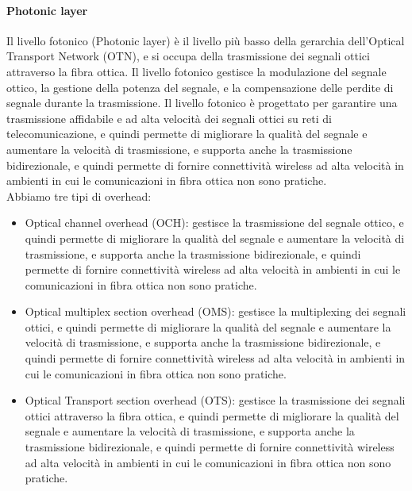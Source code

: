 \paragraph{Photonic layer}

Il livello fotonico (Photonic layer) è il livello più basso della gerarchia dell'Optical Transport Network (OTN), e si occupa della trasmissione dei segnali ottici attraverso la fibra ottica. Il livello fotonico gestisce la modulazione del segnale ottico, la gestione della potenza del segnale, e la compensazione delle perdite di segnale durante la trasmissione. Il livello fotonico è progettato per garantire una trasmissione affidabile e ad alta velocità dei segnali ottici su reti di telecomunicazione, e quindi permette di migliorare la qualità del segnale e aumentare la velocità di trasmissione, e supporta anche la trasmissione bidirezionale, e quindi permette di fornire connettività wireless ad alta velocità in ambienti in cui le comunicazioni in fibra ottica non sono pratiche.\\

Abbiamo tre tipi di overhead:
\begin{itemize}
    \item Optical channel overhead (OCH): gestisce la trasmissione del segnale ottico, e quindi permette di migliorare la qualità del segnale e aumentare la velocità di trasmissione, e supporta anche la trasmissione bidirezionale, e quindi permette di fornire connettività wireless ad alta velocità in ambienti in cui le comunicazioni in fibra ottica non sono pratiche.\\
    \item Optical multiplex section overhead (OMS): gestisce la multiplexing dei segnali ottici, e quindi permette di migliorare la qualità del segnale e aumentare la velocità di trasmissione, e supporta anche la trasmissione bidirezionale, e quindi permette di fornire connettività wireless ad alta velocità in ambienti in cui le comunicazioni in fibra ottica non sono pratiche.\\
    \item Optical Transport section overhead (OTS): gestisce la trasmissione dei segnali ottici attraverso la fibra ottica, e quindi permette di migliorare la qualità del segnale e aumentare la velocità di trasmissione, e supporta anche la trasmissione bidirezionale, e quindi permette di fornire connettività wireless ad alta velocità in ambienti in cui le comunicazioni in fibra ottica non sono pratiche.\\
\end{itemize}

